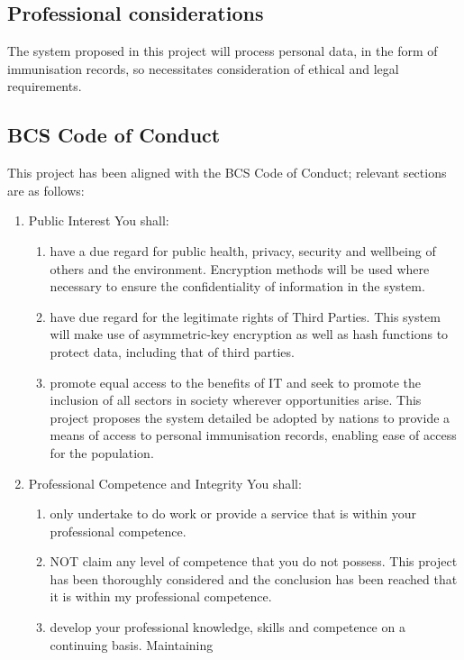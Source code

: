 \documentclass{report}
\begin{document}
\begin{flushleft}
\chapter{Professional considerations}
The system proposed in this project will process personal data,
in the form of immunisation records, so necessitates
consideration of ethical and legal requirements.

\section{BCS Code of Conduct}
This project has been aligned with the BCS Code of Conduct;
relevant sections are as follows:
\renewcommand{\labelenumii}{\alph{enumii}}
 \begin{enumerate}
   \item Public Interest
   You shall:
   \begin{enumerate}
     \item have a due regard for public health, privacy,
     security and wellbeing of others and the environment.
     Encryption methods will be used where necessary to
     ensure the confidentiality of information in the
     system.
     \item have due regard for the legitimate rights of Third
     Parties.
     This system will make use of asymmetric-key
     encryption as well as hash functions to protect data,
     including that of third parties.
     \item promote equal access to the benefits of IT and
     seek to promote the inclusion of all sectors in society
     wherever opportunities arise.
     This project proposes the system detailed be adopted
     by nations to provide a means of access to personal
     immunisation records, enabling ease of access for the
     population.
    \end{enumerate}
   \item Professional Competence and Integrity
   You shall:
   \begin{enumerate}
    \item only undertake to do work or provide a service
    that is within your professional competence.
    \item NOT claim any level of competence that you do
    not possess. This project has been thoroughly considered and the
    conclusion has been reached that it is within my
    professional competence.
    \item develop your professional knowledge, skills and
    competence on a continuing basis. Maintaining

\end{enumerate}
\end{enumerate}
\end{flushleft}
\end{document}
